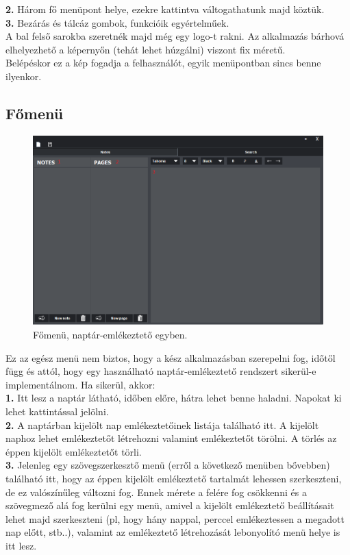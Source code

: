 \noindent \textbf{2.} Három fő menüpont helye, ezekre kattintva váltogathatunk majd köztük.
\vspace{5pt} \\ \textbf{3.} Bezárás és tálcáz gombok, funkcióik egyértelműek.
\vspace{5pt} \\A bal felső sarokba szeretnék majd még egy logo-t rakni. Az alkalmazás bárhová elhelyezhető a képernyőn (tehát lehet húzgálni) viszont fix méretű.
\vspace{5pt} \\Belépéskor ez a kép fogadja a felhasználót, egyik menüpontban sincs benne ilyenkor.

\subsection{Főmenü}

\begin{figure}[h]
	\centering
	\includegraphics[scale=0.7]{images/menu_2.png}
	\caption{Főmenü, naptár-emlékeztető egyben.}
	\label{fig:menu_main}
\end{figure}

\noindent Ez az egész menü nem biztos, hogy a kész alkalmazásban szerepelni fog, időtől függ és attól, hogy egy használható naptár-emlékeztető rendszert sikerül-e implementálnom. Ha sikerül, akkor:
\vspace{5pt} \\ \textbf{1.} Itt lesz a naptár látható, időben előre, hátra lehet benne haladni. Napokat ki lehet kattintással jelölni.
\vspace{5pt} \\ \textbf{2.} A naptárban kijelölt nap emlékeztetőinek listája található itt. A kijelölt naphoz lehet emlékeztetőt létrehozni valamint emlékeztetőt törölni. A törlés az éppen kijelölt emlékeztetőt törli. 
\vspace{5pt} \\ \textbf{3.} Jelenleg egy szövegszerkesztő menü (erről a következő menüben bővebben) található itt, hogy az éppen kijelölt emlékeztető tartalmát lehessen szerkeszteni, de ez valószínűleg változni fog. Ennek mérete a felére fog csökkenni és a szövegmező alá fog kerülni egy menü, amivel a kijelölt emlékeztető beállításait lehet majd szerkeszteni (pl, hogy hány nappal, perccel emlékeztessen a megadott nap előtt, stb..), valamint az emlékeztető létrehozását lebonyolító menü helye is itt lesz.

